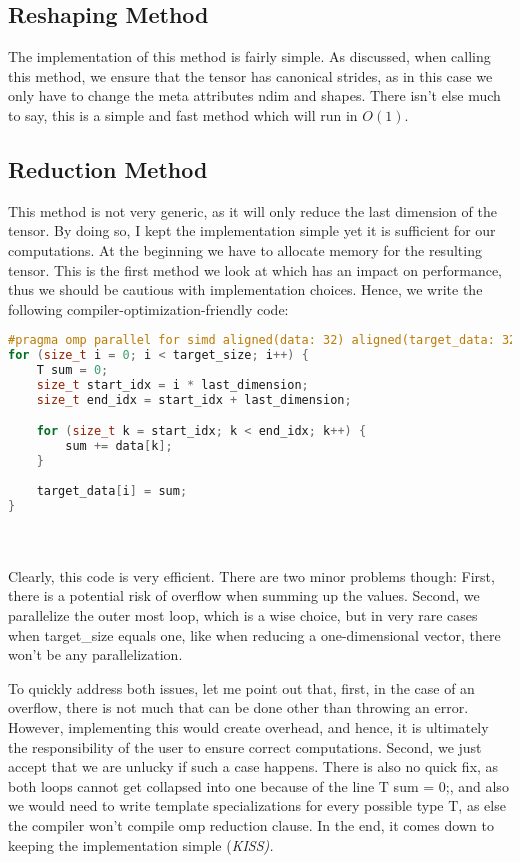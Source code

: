 \documentclass[sigconf]{acmart}
\renewcommand{\texttt}[1]{\begingroup\ttfamily\sloppy\hbadness=10000 #1\endgroup}
\begin{document}
\subsection{Reshaping Method}
The implementation of this method is fairly simple. As discussed, when calling this method, we ensure that the tensor has canonical strides, as in this case we only have to change the meta attributes \texttt{ndim} and \texttt{shapes}. There isn't else much to say, this is a simple and fast method which will run in $O(1)$.

\subsection{Reduction Method}
This method is not very generic, as it will only reduce the last dimension of the tensor. By doing so, I kept the implementation simple yet it is sufficient for our computations. At the beginning we have to allocate memory for the resulting tensor. This is the first method we look at which has an impact on performance, thus we should be cautious with implementation choices. Hence, we write the following compiler-optimization-friendly code:

\begin{lstlisting}[language=C++]
#pragma omp parallel for simd aligned(data: 32) aligned(target_data: 32)
for (size_t i = 0; i < target_size; i++) {
    T sum = 0;
    size_t start_idx = i * last_dimension;
    size_t end_idx = start_idx + last_dimension;

    for (size_t k = start_idx; k < end_idx; k++) {
        sum += data[k];
    }
    
    target_data[i] = sum;
}
\end{lstlisting}
\\\\
Clearly, this code is very efficient. There are two minor problems though: First, there is a potential risk of overflow when summing up the values. Second, we parallelize the outer most loop, which is a wise choice, but in very rare cases when \texttt{target\_size} equals one, like when reducing a one-dimensional vector, there won't be any parallelization.

To quickly address both issues, let me point out that, first, in the case of an overflow, there is not much that can be done other than throwing an error. However, implementing this would create overhead, and hence, it is ultimately the responsibility of the user to ensure correct computations. Second, we just accept that we are unlucky if such a case happens. There is also no quick fix, as both loops cannot get collapsed into one because of the line \texttt{T sum = 0;}, and also we would need to write template specializations for every possible type \texttt{T}, as else the compiler won't compile omp reduction clause. In the end, it comes down to keeping the implementation simple (\em KISS\em ).
\end{document}
